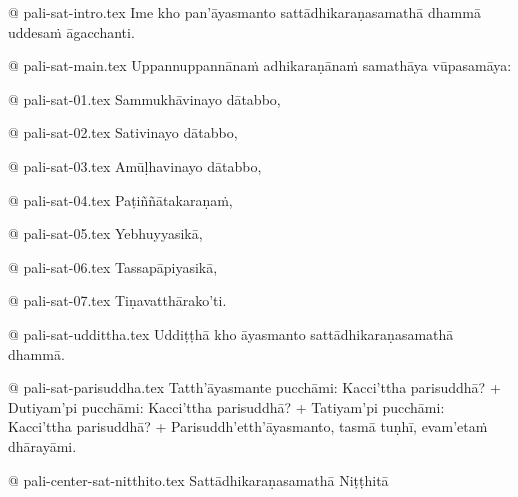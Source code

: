 @ pali-sat-intro.tex
Ime kho pan’āyasmanto sattādhikaraṇasamathā dhammā uddesaṁ āgacchanti.

@ pali-sat-main.tex
Uppannuppannānaṁ adhikaraṇānaṁ samathāya vūpasamāya:

@ pali-sat-01.tex
Sammukhāvinayo dātabbo,

@ pali-sat-02.tex
Sativinayo dātabbo,

@ pali-sat-03.tex
Amūḷhavinayo dātabbo,

@ pali-sat-04.tex
Paṭiññātakaraṇaṁ,

@ pali-sat-05.tex
Yebhuyyasikā,

@ pali-sat-06.tex
Tassapāpiyasikā,

@ pali-sat-07.tex
Tiṇavatthārako’ti.

@ pali-sat-uddittha.tex
Uddiṭṭhā kho āyasmanto sattādhikaraṇasamathā dhammā.

@ pali-sat-parisuddha.tex
Tatth’āyasmante pucchāmi: Kacci’ttha parisuddhā? +
Dutiyam’pi pucchāmi: Kacci’ttha parisuddhā? +
Tatiyam’pi pucchāmi: Kacci’ttha parisuddhā? +
Parisuddh’etth’āyasmanto, tasmā tuṇhī, evam’etaṁ dhārayāmi.

@ pali-center-sat-nitthito.tex
Sattādhikaraṇasamathā Niṭṭhitā

